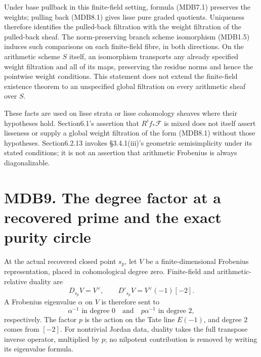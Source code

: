 \documentclass[
]{report}
\begin{document}
Under base pullback in this finite-field setting, formula (MDB7.1)
preserves the weights; pulling back (MDB8.1) gives lisse pure graded
quotients. Uniqueness therefore identifies the pulled-back filtration
with the weight filtration of the pulled-back sheaf. The norm-preserving
branch scheme isomorphism (MDB1.5) induces such comparisons on each
finite-field fibre, in both directions. On the arithmetic scheme \(S\)
itself, an isomorphism transports any already specified weight
filtration and all of its maps, preserving the residue norms and hence
the pointwise weight conditions. This statement does not extend the
finite-field existence theorem to an unspecified global filtration on
every arithmetic sheaf over \(S\).

These facts are used on lisse strata or lisse cohomology sheaves where
their hypotheses hold. Section6.1's assertion that \(R^if_*\mathcal F\)
is mixed does not itself assert lisseness or supply a global weight
filtration of the form (MDB8.1) without those hypotheses. Section6.2.13
invokes §3.4.1(iii)'s geometric semisimplicity under its stated
conditions; it is not an assertion that arithmetic Frobenius is always
diagonalizable.

\section{MDB9. The degree factor at a recovered prime and the exact
purity
circle}\label{mdb9.-the-degree-factor-at-a-recovered-prime-and-the-exact-purity-circle}

At the actual recovered closed point \(s_p\), let \(V\) be a
finite-dimensional Frobenius representation, placed in cohomological
degree zero. Finite-field and arithmetic-relative duality are \[
D_{s_p}V=V^\vee,\qquad
D'_{s_p}V=V^\vee(-1)[-2].
\tag{MDB9.1}
\] A Frobenius eigenvalue \(\alpha\) on \(V\) is therefore sent to \[
\alpha^{-1}\text{ in degree }0
\quad\text{and}\quad
p\alpha^{-1}\text{ in degree }2,
\tag{MDB9.2}
\] respectively. The factor \(p\) is the action on the Tate line
\(E(-1)\), and degree \(2\) comes from \([-2]\). For nontrivial Jordan
data, duality takes the full transpose inverse operator, multiplied by
\(p\); no nilpotent contribution is removed by writing its eigenvalue
formula.
\end{document}
